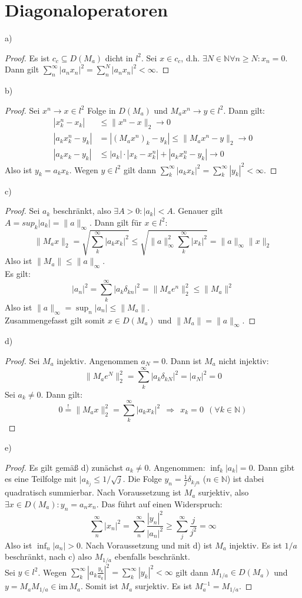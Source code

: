 \documentclass[a4paper,12pt]{article}
\begin{document}
\section{Diagonaloperatoren}
a)
\begin{proof}
Es ist $c_c\subseteq D(M_a)$ dicht in $l^2$. Sei $x\in c_c$, d.h. $\exists N\in\mathbb{N}\forall n\ge N:x_n=0$. Dann gilt $\sum_n^\infty |a_nx_n|^2=\sum_n^N|a_nx_n |^2<\infty$. 
\end{proof}
b)
\begin{proof}
Sei $x^n\rightarrow x\in l^2$ Folge in $D(M_a)$ und $M_ax^n\rightarrow y\in l^2$. Dann gilt:
\begin{align*}
|x_k^n-x_k|&\le\|x^n-x\|_2\rightarrow 0\\
|a_kx_k^n-y_k|&=|(M_ax^n)_k-y_k|\le\|M_ax^n-y\|_2\rightarrow 0\\
|a_kx_k-y_k|&\le |a_k|\cdot|x_k-x_k^n|+|a_kx_k^n- y_k|\rightarrow 0
\end{align*}
Also ist $y_k=a_kx_k$. Wegen $y\in l^2$ gilt dann $\sum_k^\infty |a_kx_k|^2=\sum_k^\infty |y_k|^2<\infty$.
\end{proof}
c)
\begin{proof}
Sei $a_k$ beschränkt, also $\exists A>0:|a_k|<A$. Genauer gilt $A=sup_k|a_k|=\|a\|_\infty$. Dann gilt für $x\in l^2$:
$$\|M_ax\|_2=\sqrt{\sum_k^\infty |a_kx_k|^2}\le \sqrt{\|a\|_\infty^2\sum_k^\infty |x_k|^2}=\|a\|_\infty\|x\|_2$$
Also ist $\|M_a\|\le \|a\|_\infty$.\\
Es gilt:
$$|a_n|^2=\sum_k^\infty |a_k\delta_{kn}|^2=\|M_ae^n\|_2^2\le\|M_a\|^2$$
Also ist $\|a\|_\infty=\sup_n|a_n|\le\|M_a\|$. \\
Zusammengefasst gilt somit $x\in D(M_a)$ und $\|M_a\|=\|a\|_\infty$.
\end{proof}
d)
\begin{proof}
Sei $M_a$ injektiv. Angenommen $a_N=0$. Dann ist $M_a$ nicht injektiv:
$$\|M_ae^N\|_2^2=\sum_k^\infty |a_k\delta_{kN}|^2=|a_N|^2=0$$
Sei $a_k\neq 0$. Dann gilt:
$$0\overset{!}{=}\|M_ax\|_2^2=\sum_k^\infty |a_kx_k|^2\ \ \Rightarrow\ \ x_k=0\ \ (\forall k\in\mathbb{N})$$
\end{proof}
e)
\begin{proof}
Es gilt gemäß d) zunächst $a_k\neq 0$. Angenommen: $\inf_k|a_k|=0$. Dann gibt es eine Teilfolge mit $|a_{k_j}\le 1/\sqrt{j}$. Die Folge $y_n=\frac{1}{j}\delta_{k_j n}$ ($n\in\mathbb{N}$) ist dabei quadratisch summierbar. Nach Voraussetzung ist $M_a$ surjektiv, also $\exists x\in D(M_a): y_n=a_nx_n$. Das führt auf einen Widerspruch:
$$\sum_n^\infty |x_n|^2=\sum_n^\infty\frac{|y_n|^2}{|a_n|^2}\ge \sum_j^\infty \frac{j}{j^2}=\infty$$
Also ist $\inf_n|a_n|>0$. 
Nach Voraussetzung und mit d) ist $M_a$ injektiv. Es ist $1/a$ beschränkt, nach c) also $M_{1/a}$ ebenfalls beschränkt. \\
Sei $y\in l^2$. Wegen $\sum_k^\infty |a_k\frac{y_k}{a_k}|^2=\sum_k^\infty |y_k|^2<\infty $ gilt dann $M_{1/a}\in D(M_a)$ und $y=M_aM_{1/a}\in\mathrm{im\,}M_a$. Somit ist $M_a$ surjektiv. Es ist $M_a^{-1}=M_{1/a}$.
\end{proof}
\end{document}
